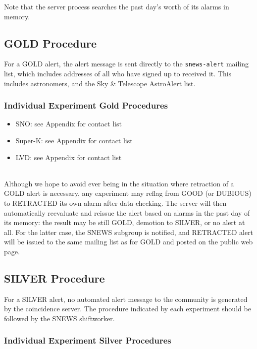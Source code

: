 \documentclass{article}
\begin{document}
Note that the server process searches the past day's worth of its
alarms in memory.  


\subsection{GOLD Procedure}\label{GOLD}

For a GOLD alert, the alert message is sent directly to the 
{\tt snews-alert} mailing list, which includes addresses of all
who have signed up to received it. This includes astronomers,
and the Sky \& Telescope AstroAlert list. 

\subsubsection{Individual Experiment Gold Procedures}

\begin{itemize}

\item SNO: see Appendix for contact list
\item Super-K: see Appendix for contact list
\item LVD: see Appendix for contact list

\end{itemize}


\\ Although we hope
to avoid ever being in the situation where retraction of a GOLD alert
is necessary, any experiment may reflag from GOOD (or DUBIOUS) to RETRACTED its
own alarm after data checking.  The server will then automatically
reevaluate and reissue the alert based on alarms in the past day of its
memory: the result may be still GOLD, demotion to SILVER, or no alert
at all.  For the latter case, the SNEWS subgroup is 
notified, and RETRACTED alert will be issued to the
same mailing list as for GOLD and posted on the public web page.

\subsection{SILVER Procedure}\label{SILVER}
For a SILVER alert, no automated alert message to the community
is generated by the coincidence server. 
The procedure indicated by each experiment should be followed by
the SNEWS shiftworker.\\

\subsubsection{Individual Experiment Silver Procedures}
\end{document}
